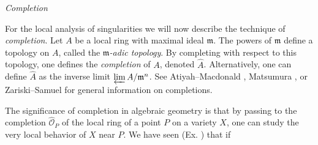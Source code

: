 {\medskip
\noindent\emph{Completion}\par
\noindent For the local analysis of singularities we will now describe the technique of \emph{completion}. Let $A$ be a local ring with maximal ideal $\mathfrak m$. The powers of $\mathfrak m$ define a topology on $A$, called the \emph{$\mathfrak m$-adic topology}. By completing with respect to this topology, one defines the \emph{completion} of $A$, denoted $\widehat A$. Alternatively, one can define $\widehat A$ as the inverse limit $\varprojlim A/\mathfrak m^n$. See Atiyah--Macdonald , Matsumura , or Zariski--Samuel  for general information on completions.

The significance of completion in algebraic geometry is that by passing to the completion $\widehat{\mathcal O}_P$ of the local ring of a point $P$ on a variety $X$, one can study the very local behavior of $X$ near $P$. We have seen (Ex. ) that if}
